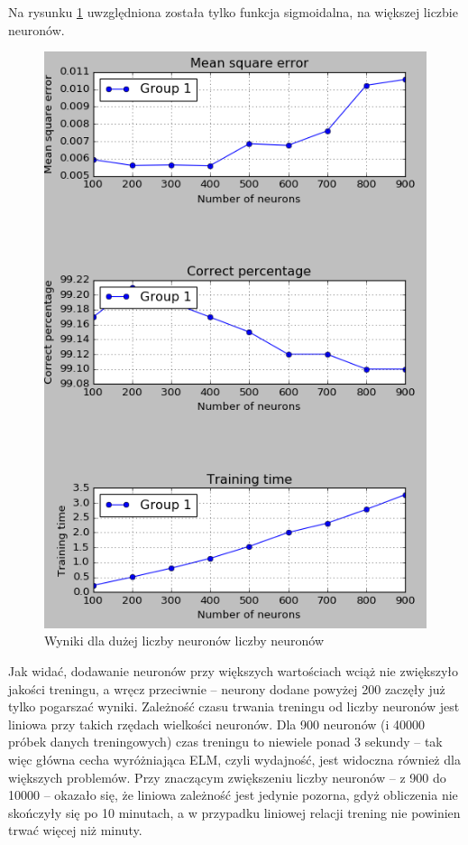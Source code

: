 \documentclass{article}
\begin{document}
Na rysunku \ref{wyniki_dota2_python_performance} uwzględniona została tylko funkcja sigmoidalna, na większej liczbie neuronów.
\begin{figure}[H]
\centering
\includegraphics[width=\textwidth]{wyniki_dota2_python_performance.png}
\caption{Wyniki dla dużej liczby neuronów liczby neuronów}
\label{wyniki_dota2_python_performance}
\end{figure}
Jak widać, dodawanie neuronów przy większych wartościach wciąż nie zwiększyło jakości treningu, a wręcz przeciwnie -- neurony dodane powyżej 200 zaczęły już tylko pogarszać wyniki. Zależność czasu trwania treningu od liczby neuronów jest liniowa przy takich rzędach wielkości neuronów. Dla 900 neuronów (i 40000 próbek danych treningowych) czas treningu to niewiele ponad 3 sekundy -- tak więc główna cecha wyróżniająca ELM, czyli wydajność, jest widoczna również dla większych problemów. Przy znaczącym zwiększeniu liczby neuronów -- z 900 do 10000 -- okazało się, że liniowa zależność jest jedynie pozorna, gdyż obliczenia nie skończyły się po 10 minutach, a w przypadku liniowej relacji trening nie powinien trwać więcej niż minuty.
\label{10000_dota2}
\end{document}
